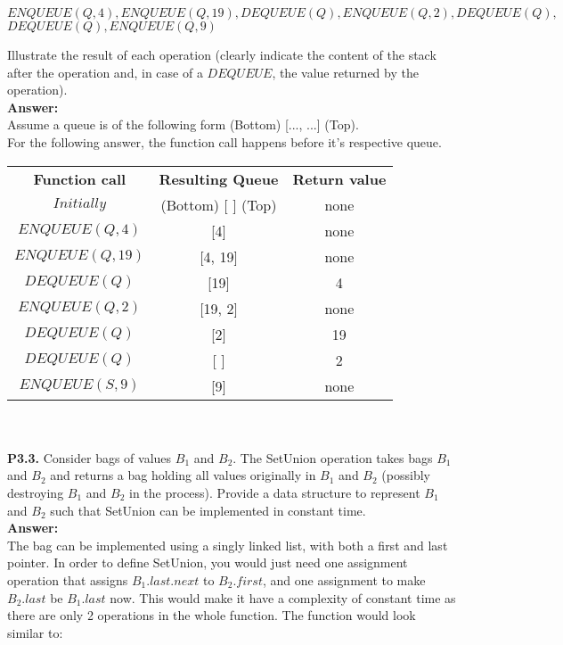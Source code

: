 \documentclass{article}
\begin{document}
\begin{center}
    $ENQUEUE(Q,4), ENQUEUE(Q,19), DEQUEUE(Q), ENQUEUE(Q,2), DEQUEUE(Q), $
    $DEQUEUE(Q), ENQUEUE(Q,9)$
\end{center}

\noindent
Illustrate the result of each operation (clearly indicate the content of the stack after the operation and, in case of a $DEQUEUE$, the value returned by the operation).\\

\noindent \textbf{Answer: }\\
Assume a queue is of the following form (Bottom) [..., ...] (Top).\\
For the following answer, the function call happens before it's respective queue.\\
\noindent

\bgroup
\def\arraystretch{1.2}
\begin{tabular}{ c c c }
    \textbf{Function call} & \textbf{Resulting Queue} & \textbf{Return value}\\
    $Initially$ & (Bottom) [ ] (Top) & none\\
    $ENQUEUE(Q,4)$ & [4] & none\\
    $ENQUEUE(Q,19)$ & [4, 19] & none\\
    $DEQUEUE(Q)$ & [19] & 4\\
    $ENQUEUE(Q,2)$ & [19, 2] & none\\
    $DEQUEUE(Q)$ & [2] & 19\\
    $DEQUEUE(Q)$ & [ ] & 2\\
    $ENQUEUE(S,9)$ & [9] & none\\
\end{tabular}
\egroup\\\\

\noindent
\textbf{P3.3.} Consider bags of values $B_1$ and $B_2$. The SetUnion operation takes bags $B_1$ and $B_2$ and returns a bag
holding all values originally in $B_1$ and $B_2$ (possibly destroying $B_1$ and $B_2$ in the process). Provide a data structure to represent $B_1$ and $B_2$ such that SetUnion can be implemented in constant time.\\

\noindent \textbf{Answer: }\\
The bag can be implemented using a singly linked list, with both a first and last pointer.
In order to define SetUnion, you would just need one assignment operation that assigns $B_1.last.next$ to $B_2.first$, and one assignment to make $B_2.last$ be $B_1.last$ now. This would make it have a complexity of constant time as there are only 2 operations in the whole function. The function would look similar to:
\end{document}
